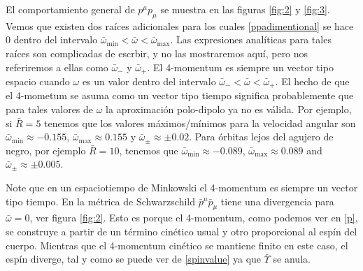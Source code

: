 El comportamiento general de $p^{\mu}p_{\mu}$ se muestra en las figuras \ref{fig:2} y \ref{fig:3}. Vemos que existen dos raíces adicionales para los cuales \eqref{ppadimentional} se hace 0 dentro del intervalo $\bar{\omega}_{\mathrm{min}} < \bar{\omega} < \bar{\omega}_{\mathrm{max}}$. Las expresiones analíticas para tales raíces son complicadas de escrbir, y no las mostraremos aquí, pero nos referiremos a ellas como $\bar{\omega}_-$ y $\bar{\omega}_+$. El 4-momentum es siempre un vector tipo espacio cuando $\omega$ es un valor dentro del intervalo $\bar{\omega}_- < \bar{\omega} < \bar{\omega}_+$. El hecho de que el 4-mometum se asuma como un vector tipo tiempo significa probablemente que para tales valores de $\omega$ la aproximación polo-dipolo ya no es válida. Por ejemplo, si $\bar{R} = 5$ tenemos que los valores máximos/mínimos para la velocidad angular son $\bar{\omega}_{\mathrm{min}} \approx -0.155$, $\bar{\omega}_{\mathrm{max}} \approx 0.155$ y $\bar{\omega}_{\pm} \approx \pm 0.02$. Para órbitas lejos del agujero de negro, por ejemplo $\bar{R} = 10$, tenemos que $\bar{\omega}_{\mathrm{min}} \approx -0.089$, $\bar{\omega}_{\mathrm{max}} \approx 0.089$ and $\bar{\omega}_{\pm} \approx \pm 0.005$.

Note que en un espaciotiempo de Minkowski el 4-momentum es siempre un vector tipo tiempo. En la métrica de Schwarzschild $\bar{p}^{\mu}\bar{p}_{\mu}$ tiene una divergencia para $ \bar{\omega} =  0 $, ver figura \ref{fig:2}. Esto es porque el 4-momentum, como podemos ver en \eqref{p}, se construye a partir de un término cinético usual y otro proporcional al espín del cuerpo. Mientras que el 4-momentum cinético se mantiene finito en este caso, el espín diverge, tal y como se puede ver de \eqref{spinvalue} ya que $\bar{\Upsilon}$ se anula.

